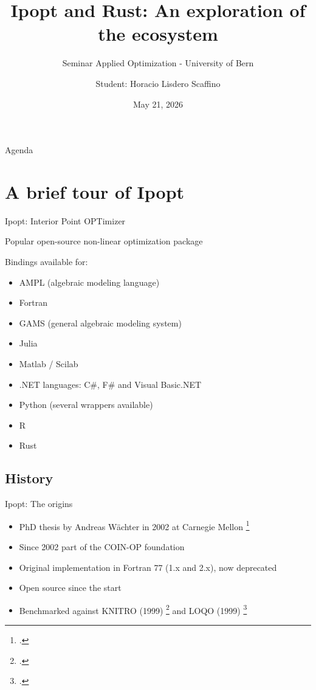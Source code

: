 \documentclass{beamer}
\title[Ipopt and Rust: An exploration of the ecosystem]{Ipopt and Rust: An exploration of the ecosystem}
\subtitle{Seminar Applied Optimization - University of Bern}
\author{Student: Horacio Lisdero Scaffino}
\institute{Supervisor: Ningfeng Zhou}
\date{May 21, 2026}
\begin{document}
\begin{frame}
  \titlepage
\end{frame}

\begin{frame}{Agenda}
  \tableofcontents
\end{frame}

\section{A brief tour of Ipopt}

\begin{frame}{Ipopt: Interior Point OPTimizer}

  Popular open-source non-linear optimization package

  \vfill

  Bindings available for:

  \begin{itemize}
    \item AMPL (algebraic modeling language)
    \item Fortran
    \item GAMS (general algebraic modeling system)
    \item Julia
    \item Matlab / Scilab
    \item .NET languages: C\#, F\# and Visual Basic.NET
    \item Python (several wrappers available)
    \item R
    \item Rust
  \end{itemize}

\end{frame}

\subsection{History}

\begin{frame}{Ipopt: The origins}

  \begin{itemize}
    \item PhD thesis by Andreas Wächter in 2002 at Carnegie Mellon \footcite{wachter2002interior}
    \item Since 2002 part of the COIN-OP foundation \nocite{coinop_ipopt}
    \item Original implementation in Fortran 77 (1.x and 2.x), now deprecated
    \item Open source since the start
    \item Benchmarked against KNITRO (1999) \footcite{byrd1999interior} and LOQO (1999) \footcite{vanderbei1999loqo}
  \end{itemize}

\end{frame}
\end{document}
